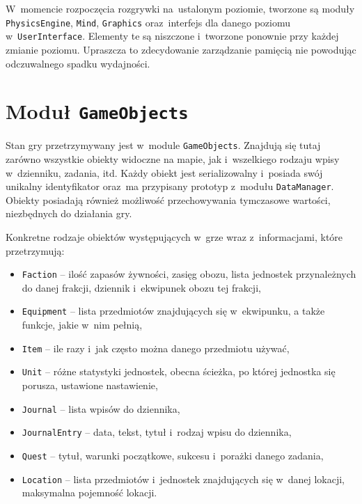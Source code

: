 \documentclass[licencjacka]{pracamgr}
\begin{document}
    W~momencie rozpoczęcia rozgrywki na~ustalonym poziomie, tworzone są moduły \texttt{PhysicsEngine},
    \texttt{Mind}, \texttt{Graphics} oraz~interfejs dla danego poziomu w~\texttt{UserInterface}. Elementy te są niszczone i~tworzone
    ponownie przy każdej zmianie poziomu. Upraszcza to zdecydowanie zarządzanie pamięcią nie powodując odczuwalnego spadku wydajności.

  \section{Moduł \texttt{GameObjects}}
    Stan gry przetrzymywany jest w~module \texttt{GameObjects}. Znajdują się tutaj zarówno wszystkie obiekty widoczne na
    mapie, jak i~wszelkiego rodzaju wpisy w~dzienniku, zadania, itd. Każdy obiekt jest serializowalny i~posiada swój unikalny
    identyfikator oraz~ma przypisany prototyp z~modułu \texttt{DataManager}. Obiekty posiadają również możliwość przechowywania
    tymczasowe wartości, niezbędnych do działania gry.

    Konkretne rodzaje obiektów występujących w~grze wraz z~informacjami, które przetrzymują:
    \begin{itemize}
      \item \texttt{Faction} -- ilość zapasów żywności, zasięg obozu, lista jednostek przynależnych do danej
	frakcji, dziennik i~ekwipunek obozu tej frakcji,
      \item \texttt{Equipment} -- lista przedmiotów znajdujących się w~ekwipunku, a także funkcje, jakie w~nim pełnią,
      \item \texttt{Item} --  ile razy i~jak często można danego przedmiotu używać,
      \item \texttt{Unit} -- różne statystyki jednostek, obecna ścieżka, po której jednostka się porusza, ustawione nastawienie,
      \item \texttt{Journal} -- lista wpisów do dziennika,
      \item \texttt{JournalEntry} -- data, tekst, tytuł i~rodzaj wpisu do dziennika,
      \item \texttt{Quest} -- tytuł, warunki początkowe, sukcesu i~porażki danego zadania,
      \item \texttt{Location} -- lista przedmiotów i~jednostek znajdujących się w~danej lokacji, maksymalna pojemność lokacji.
    \end{itemize}

\end{document}
